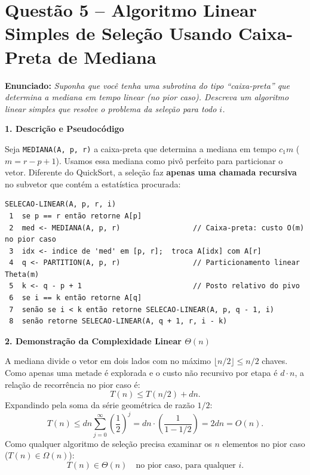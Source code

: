 \documentclass[10pt,a4paper]{article}
\newcommand{\resmath}[1]{\[\boxed{#1}\]}
\newcommand{\topico}[1]{\smallskip\noindent\textbf{\color{azul}#1}\par}
\newcommand{\questao}[2]{\section*{\large\color{azul}Questão #1 -- #2}\vspace{-4pt}}
\begin{document}
\questao{5}{Algoritmo Linear Simples de Seleção Usando Caixa-Preta de Mediana}

\textbf{Enunciado:} \textit{Suponha que você tenha uma subrotina do tipo ``caixa-preta'' que determina a mediana em tempo linear (no pior caso). Descreva um algoritmo linear simples que resolve o problema da seleção para todo $i$.}

\topico{1. Descrição e Pseudocódigo}
Seja \texttt{MEDIANA(A, p, r)} a caixa-preta que determina a mediana em tempo $c_1 m$ ($m = r - p + 1$). Usamos essa mediana como pivô perfeito para particionar o vetor. Diferente do QuickSort, a seleção faz \textbf{apenas uma chamada recursiva} no subvetor que contém a estatística procurada:

\begin{lstlisting}
SELECAO-LINEAR(A, p, r, i)
 1  se p == r então retorne A[p]
 2  med <- MEDIANA(A, p, r)                 // Caixa-preta: custo O(m) no pior caso
 3  idx <- indice de 'med' em [p, r];  troca A[idx] com A[r]
 4  q <- PARTITION(A, p, r)                 // Particionamento linear Theta(m)
 5  k <- q - p + 1                          // Posto relativo do pivo
 6  se i == k então retorne A[q]
 7  senão se i < k então retorne SELECAO-LINEAR(A, p, q - 1, i)
 8  senão retorne SELECAO-LINEAR(A, q + 1, r, i - k)
\end{lstlisting}

\topico{2. Demonstração da Complexidade Linear $\Theta(n)$}
A mediana divide o vetor em dois lados com no máximo $\lfloor n/2 \rfloor \le n/2$ chaves. Como apenas uma metade é explorada e o custo não recursivo por etapa é $d \cdot n$, a relação de recorrência no pior caso é:
\[
T(n) \le T(n/2) + dn.
\]
Expandindo pela soma da série geométrica de razão $1/2$:
\[
T(n) \le dn \sum_{j=0}^{\infty} \left(\frac{1}{2}\right)^j = dn \cdot \left(\frac{1}{1 - 1/2}\right) = 2dn = O(n).
\]
Como qualquer algoritmo de seleção precisa examinar os $n$ elementos no pior caso ($T(n) \in \Omega(n)$):
\resmath{T(n) \in \Theta(n) \quad \text{no pior caso, para qualquer } i.}
\end{document}
